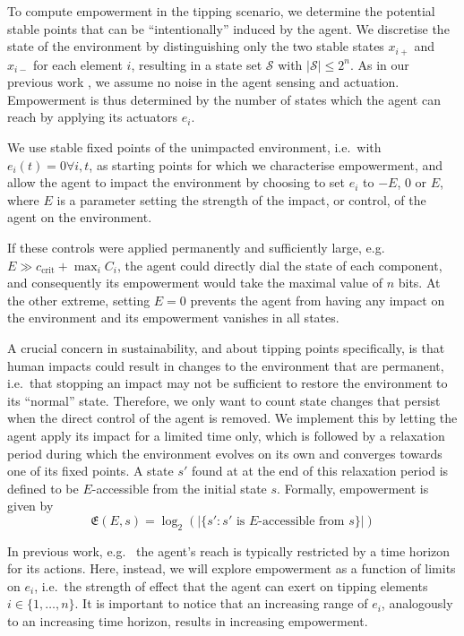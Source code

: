 \documentclass[conference]{IEEEtran}
\newcommand{\ccrit}{\ensuremath{c_{\mathrm{crit}}}}
\newcommand{\agentimpact}{\ensuremath{e}}
\newcommand{\empowerment}{\ensuremath{\mathfrak{E}}}
\newcommand{\setsymbol}[1]{\ensuremath{\mathcal{#1}}}
\newcommand{\stateset}{\ensuremath{\setsymbol{S}}}
\begin{document}
To compute empowerment in the tipping scenario, we determine the
potential stable points that can be ``intentionally'' induced by the
agent. We discretise the state of the environment by distinguishing
only the two stable states $x_{i+}$ and $x_{i-}$ for each element $i$,
resulting in a state set $\stateset$ with $|\stateset| \le 2^n$. As in
our previous work \cite{Kim2009_sustainability}, we assume no noise in
the agent sensing and actuation. Empowerment is thus determined by the
number of states which the agent can reach by applying its actuators
$\agentimpact_i$.

We use stable fixed points of the unimpacted environment, i.e.\ with
$\agentimpact_i(t) = 0 \forall i, t$, as starting points for which we
characterise empowerment, and allow the agent to impact the
environment by choosing to set $\agentimpact_i$ to $-E$, $0$ or $E$,
where $E$ is a parameter setting the strength of the impact, or
control, of the agent on the environment.

If these controls were applied permanently and sufficiently large,
e.g. $E \gg \ccrit + \max_i C_i$, the agent could directly dial the
state of each component, and consequently its empowerment would take
the maximal value of $n$ bits. At the other extreme, setting $E = 0$
prevents the agent from having any impact on the environment and its
empowerment vanishes in all states.

A crucial concern in sustainability, and about tipping points
specifically, is that human impacts could result in changes to the
environment that are permanent, i.e.\ that stopping an impact may not
be sufficient to restore the environment to its ``normal'' state.
Therefore, we only want to count state changes that persist when the
direct control of the agent is removed. We implement this by letting
the agent apply its impact for a limited time only, which is followed
by a relaxation period during which the environment evolves on its own
and converges towards one of its fixed points. A state $s'$ found at
at the end of this relaxation period is defined to be $E$-accessible from
the initial state $s$. Formally, empowerment is given by
\begin{equation}
  \label{eq_empowerment}
  \empowerment(E, s) =
  \log_2(|\{s': s' \mbox{ is } E\mbox{-accessible from } s\}|)
\end{equation}

In previous work, e.g.\ \cite{Salge2014_empowermentintro} the agent's
reach is typically restricted by a time horizon for its actions. Here,
instead, we will explore empowerment as a function of limits on
$\agentimpact_i$, i.e.\ the strength of effect that the agent can
exert on tipping elements $i \in \{1, \ldots, n\}$. It is important to
notice that an increasing range of $\agentimpact_i$, analogously to an
increasing time horizon, results in increasing empowerment.
\end{document}
